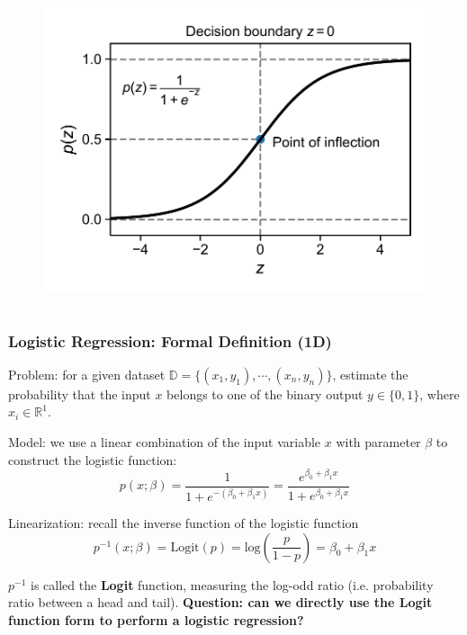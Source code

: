 \documentclass[10pt,aspectratio=169]{beamer}
\begin{document}
\begin{frame}
\begin{columns}[T]
\begin{column}{0.5\textwidth}
        \begin{figure}[t]%
          \hspace*{-0.1\textwidth}%
          \includegraphics[width=1.2\textwidth]{scripts/logistic_fun_alone.pdf}
        \end{figure}
        
      \end{column}
      
    \end{columns}
  \end{frame}

  \begin{frame}
    \frametitle{Logistic Regression: Formal Definition (1D)}
    Problem: for a given dataset
    $\mathbb{D} = \{(x_{1}, y_{1}), \cdots, (x_{n}, y_{n})\}$,
    estimate the probability that the input $x$ belongs to one of the
    binary output $y \in \{0, 1\}$, where $x_{i} \in \mathbb{R}^{1}$.

    \vfill Model: we use a linear combination of the input variable
    $x$ with parameter $\beta$ to construct the logistic function:
    \begin{equation*}
      p(x; \beta) = \dfrac{1}{1 + e^{-(\beta_{0} + \beta_{1} x)}} = \dfrac{e^{\beta_{0} + \beta_{1} x}}{1 + e^{\beta_{0} + \beta_{1} x}}
    \end{equation*}

    \vfill Linearization: recall the inverse function of the logistic
    function
    \begin{equation*}
      p^{-1}(x; \beta) = \mathrm{Logit}(p) = \mathrm{log} (\dfrac{p}{1 - p} ) = \beta_{0} + \beta_{1} x
    \end{equation*}

    $p^{-1}$ is called the \textbf{Logit} function, measuring the
    log-odd ratio (i.e. probability ratio between a head and tail). %
    \vfill%
    \textbf{Question: can we directly use the Logit function form to
      perform a logistic regression?}
  
  \end{frame}
\end{document}
